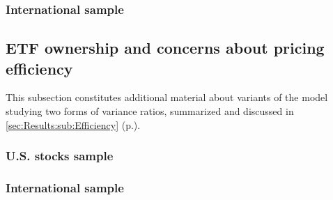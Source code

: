 \subsubsection{International sample}


\subsection{ETF ownership and concerns about pricing efficiency}
\label{app:sec:DetailedResults:Efficiency}
This subsection constitutes additional material about variants of the model studying two forms of variance ratios, summarized and discussed in \autoref{sec:Results:sub:Efficiency} (p.\pageref{sec:Results:sub:Efficiency}).
\subsubsection{U.S. stocks sample}
\subsubsection{International sample}
